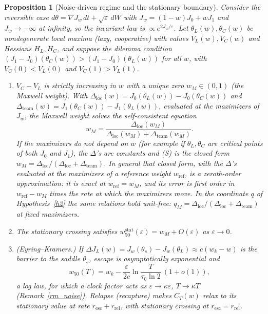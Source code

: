 \documentclass[11pt]{article}
\newtheorem{proposition}{Proposition}
\theoremstyle{definition}
\theoremstyle{remark}
\newcommand{\wfifty}{w_{50}}
\begin{document}
\begin{proposition}[Noise-driven regime and the stationary boundary]\label{p5}
Consider the reversible case $d\theta=\nabla J_w\,dt+\sqrt\varepsilon\,dW$ with $J_w=(1-w)J_0+wJ_1$ and $J_w\to-\infty$ at infinity, so the invariant law is $\propto e^{2J_w/\varepsilon}$. Let $\theta_L(w),\theta_C(w)$ be nondegenerate local maxima (lazy, cooperative) with values $V_L(w),V_C(w)$ and Hessians $H_L,H_C$, and suppose the \emph{dilemma condition} $(J_1-J_0)(\theta_C(w))>(J_1-J_0)(\theta_L(w))$ for all $w$, with $V_C(0)<V_L(0)$ and $V_C(1)>V_L(1)$.
\begin{enumerate}[label=(\roman*)]
\item $V_C-V_L$ is strictly increasing in $w$ with a unique zero $w_M\in(0,1)$ (the \emph{Maxwell weight}). With $\Delta_{\mathrm{loc}}(w)=J_0(\theta_L(w))-J_0(\theta_C(w))$ and $\Delta_{\mathrm{team}}(w)=J_1(\theta_C(w))-J_1(\theta_L(w))$, evaluated at the maximizers of $J_w$, the Maxwell weight solves the self-consistent equation
\[
w_M=\frac{\Delta_{\mathrm{loc}}(w_M)}{\Delta_{\mathrm{loc}}(w_M)+\Delta_{\mathrm{team}}(w_M)}.\tag{S}
\]
If the maximizers do not depend on $w$ (for example if $\theta_L,\theta_C$ are critical points of both $J_0$ and $J_1$), the $\Delta$'s are constants and (S) is the closed form $w_M=\Delta_{\mathrm{loc}}/(\Delta_{\mathrm{loc}}+\Delta_{\mathrm{team}})$. In general that closed form, with the $\Delta$'s evaluated at the maximizers of a reference weight $w_{\mathrm{ref}}$, is a \emph{zeroth-order approximation}: it is exact at $w_{\mathrm{ref}}=w_M$, and its error is first order in $w_{\mathrm{ref}}-w_M$ times the rate at which the maximizers move.
In the coordinate $q$ of Hypothesis~\ref{h2} the same relations hold unit-free: $q_M=\Delta_{\mathrm{loc}}/(\Delta_{\mathrm{loc}}+\Delta_{\mathrm{team}})$ at fixed maximizers.
\item The stationary crossing satisfies $w_{50}^{\mathrm{stat}}(\varepsilon)=w_M+O(\varepsilon)$ as $\varepsilon\to0$.
\item (Eyring--Kramers.) If $\Delta J_L(w)=J_w(\theta_s)-J_w(\theta_L)\approx c(w_k-w)$ is the barrier to the saddle $\theta_s$, escape is asymptotically exponential and
\[
\wfifty(T)=w_k-\frac{\varepsilon}{2c}\ln\frac{T}{\tau_0\ln2}\ (1+o(1)),
\]
a \emph{log law}, for which a clock factor acts as $\varepsilon\to\kappa\varepsilon$, $T\to\kappa T$ (Remark~\ref{rm_noise}). Relapse (recapture) makes $C_T(w)$ relax to its stationary value at rate $r_{\mathrm{esc}}+r_{\mathrm{rel}}$, with stationary crossing at $r_{\mathrm{esc}}=r_{\mathrm{rel}}$.
\end{enumerate}
\end{proposition}
\end{document}
